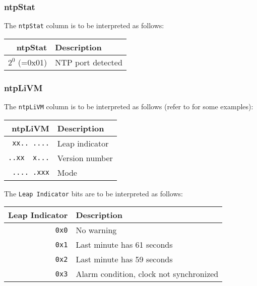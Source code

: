 \documentclass[documentation]{subfiles}
\begin{document}
\subsubsection{ntpStat}\label{ntpStat}
The {\tt ntpStat} column is to be interpreted as follows:
\begin{longtable}{rl}
    \toprule
    {\bf ntpStat} & {\bf Description}\\
    \midrule\endhead%
    $2^0$ (=0x01) & NTP port detected \\
    \bottomrule
\end{longtable}

\newpage
\subsubsection{ntpLiVM}\label{ntpLiVM}
The {\tt ntpLiVM} column is to be interpreted as follows (refer to  for some examples):
\begin{longtable}{rl}
    \toprule
    {\bf ntpLiVM} & {\bf Description}\\
    \midrule\endhead%
    {\tt xx.. ....}  & Leap indicator\\
    {\tt ..xx~ x...} & Version number\\ %
    {\tt .... .xxx}  & Mode\\
    \bottomrule
\end{longtable}

The {\tt Leap Indicator} bits are to be interpreted as follows:
\begin{longtable}{rl}
    \toprule
    {\bf Leap Indicator} & {\bf Description}\\
    \midrule\endhead%
    {\tt 0x0} & No warning\\
    {\tt 0x1} & Last minute has 61 seconds\\
    {\tt 0x2} & Last minute has 59 seconds\\
    {\tt 0x3} & Alarm condition, clock not synchronized\\
    \bottomrule
\end{longtable}
\end{document}
